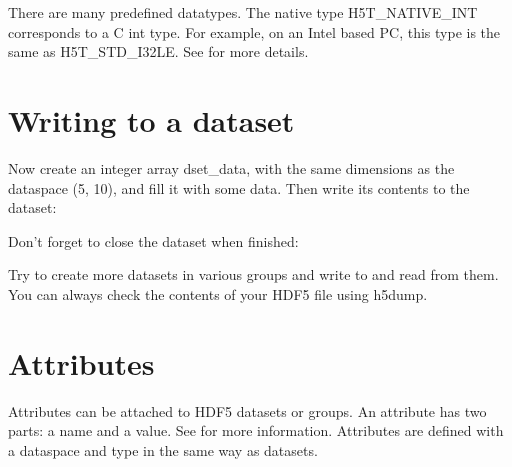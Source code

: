 \documentclass[letterpaper,10pt,english]{sphinxmanual}
\begin{document}
\sphinxAtStartPar
There are many predefined datatypes. The native type H5T\_NATIVE\_INT corresponds to a C int type. For example, on an Intel based PC, this type is the same as H5T\_STD\_I32LE. See  for more details.


\chapter{Writing to a dataset}
\label{\detokenize{index:writing-to-a-dataset}}
\sphinxAtStartPar
Now create an integer array dset\_data, with the same dimensions as the dataspace (5, 10), and fill it with some data. Then write its contents to the dataset:

\begin{sphinxVerbatim}[commandchars=\\\{\}]
 \PYG{p}{[}\PYG{p}{]}\PYG{p}{[}\PYG{p}{]}
\PYG{p}{[}\PYG{p}{]}\PYG{p}{[}\PYG{p}{]}  
          
       
\end{sphinxVerbatim}

\sphinxAtStartPar
Don’t forget to close the dataset when finished:

\begin{sphinxVerbatim}[commandchars=\\\{\}]
  
\end{sphinxVerbatim}

\sphinxAtStartPar
Try to create more datasets in various groups and write to and read from them. You can always check the contents of your HDF5 file using h5dump.


\chapter{Attributes}
\label{\detokenize{index:attributes}}
\sphinxAtStartPar
Attributes can be attached to HDF5 datasets or groups. An attribute has two parts: a name and a value. See  for more information. Attributes are defined with a dataspace and type in the same way as datasets.
\end{document}
